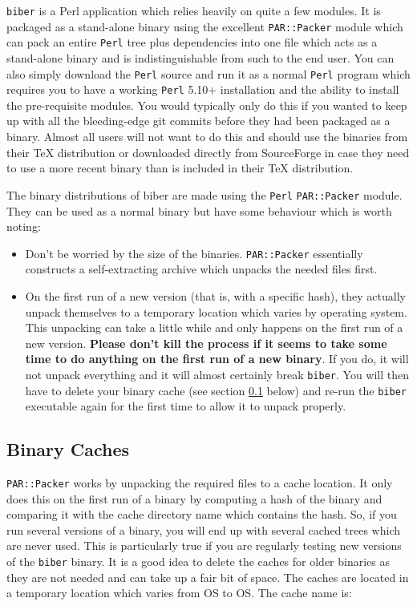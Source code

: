 \documentclass{ltxdockit}
\begin{document}
\verb+biber+ is a Perl application which relies heavily on quite a few
modules. It is packaged as a stand-alone binary using the excellent
\verb+PAR::Packer+ module which can pack an entire \verb+Perl+ tree plus
dependencies into one file which acts as a stand-alone binary and is
indistinguishable from such to the end user. You can also simply download
the \verb+Perl+ source and run it as a normal \verb+Perl+ program which
requires you to have a working \verb+Perl+ 5.10+ installation and the
ability to install the pre-requisite modules. You would typically only do
this if you wanted to keep up with all the bleeding-edge git commits before
they had been packaged as a binary. Almost all users will not want to do
this and should use the binaries from their TeX distribution or downloaded
directly from SourceForge in case they need to use a more recent binary
than is included in their TeX distribution.

The binary distributions of biber are made using the \verb+Perl+ \verb+PAR::Packer+
module. They can be used as a normal binary but have some behaviour which
is worth noting:

\begin{itemize}
\item Don't be worried by the size of the binaries. \verb+PAR::Packer+ essentially
  constructs a self-extracting archive which unpacks the needed files first.
\item On the first run of a new version (that is, with a specific hash),
  they actually unpack themselves to a temporary location which varies by
  operating system. This unpacking can take a little while and only happens
  on the first run of a new version. \textbf{Please don't kill the process
    if it seems to take some time to do anything on the first run of a new
    binary}. If you do, it will not unpack everything and it will almost
  certainly break \verb+biber+. You will then have to delete your binary
  cache (see section \ref{bc} below) and re-run the \verb+biber+ executable
  again for the first time to allow it to unpack properly.
\end{itemize}

\subsection{Binary Caches}\label{bc}

\verb+PAR::Packer+ works by unpacking the required files to a cache
location. It only does this on the first run of a binary 
by computing a hash of the binary and comparing it with
the cache directory name which contains the hash. So, if you run
several versions of a binary, you will end up with several cached
trees which are never used. This is particularly true if you are regularly
testing new versions of the \verb+biber+ binary. It is a good idea to
delete the caches for older binaries as they are not needed and can take up
a fair bit of space. The caches are located in a temporary location which
varies from OS to OS. The cache name is:\\[1ex]
\end{document}
